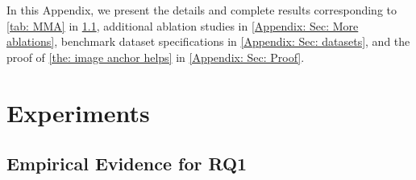 \clearpage
\setcounter{page}{1}
\maketitlesupplementary

In this Appendix, we present the details and complete results corresponding to \cref{tab: MMA} in \cref{Appendix: Sec: full MMA}, additional ablation studies in \cref{Appendix: Sec: More ablations}, benchmark dataset specifications in \cref{Appendix: Sec: datasets}, and the proof of \cref{the: image anchor helps} in \cref{Appendix: Sec: Proof}.

\section{Experiments}

\subsection{Empirical Evidence for RQ1}
\label{Appendix: Sec: full MMA}

